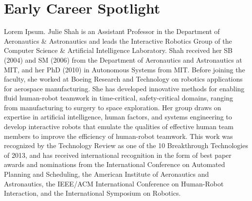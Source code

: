 \chapter{Early Career Spotlight}

{
Lorem Ipsum.
}{
Julie Shah is an Assistant Professor in the Department of Aeronautics \& Astronautics and leads the Interactive Robotics Group of the Computer Science \& Artificial Intelligence Laboratory. Shah received her SB (2004) and SM (2006) from the Department of Aeronautics and Astronautics at MIT, and her PhD (2010) in Autonomous Systems from MIT. Before joining the faculty, she worked at Boeing Research and Technology on robotics applications for aerospace manufacturing. She has developed innovative methods for enabling fluid human-robot teamwork in time-critical, safety-critical domains, ranging from manufacturing to surgery to space exploration. Her group draws on expertise in artificial intelligence, human factors, and systems engineering to develop interactive robots that emulate the qualities of effective human team members to improve the efficiency of human-robot teamwork. This work was recognized by the Technology Review as one of the 10 Breakthrough Technologies of 2013, and has received international recognition in the form of best paper awards and nominations from the International Conference on Automated Planning and Scheduling, the American Institute of Aeronautics and Astronautics, the IEEE/ACM International Conference on Human-Robot Interaction, and the International Symposium on Robotics.
}


